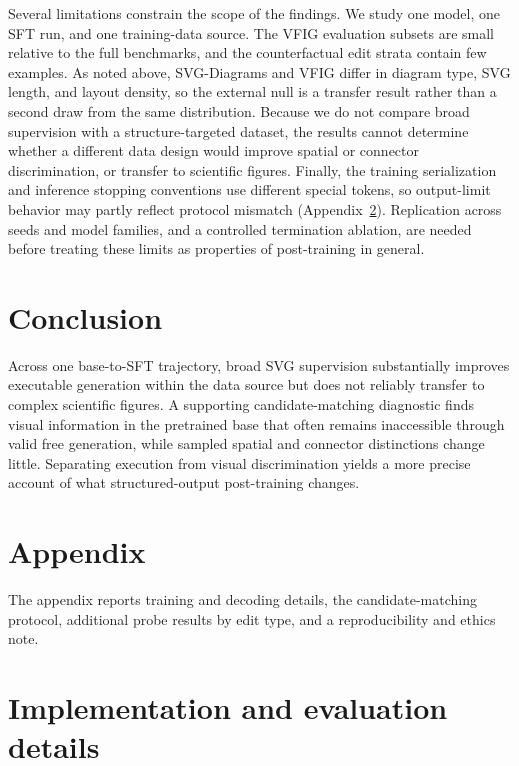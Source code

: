 \documentclass{article}
\begin{document}
Several limitations constrain the scope of the findings. We study one model, one SFT run, and one training-data source. The VFIG evaluation subsets are small relative to the full benchmarks, and the counterfactual edit strata contain few examples. As noted above, SVG-Diagrams and VFIG differ in diagram type, SVG length, and layout density, so the external null is a transfer result rather than a second draw from the same distribution. Because we do not compare broad supervision with a structure-targeted dataset, the results cannot determine whether a different data design would improve spatial or connector discrimination, or transfer to scientific figures. Finally, the training serialization and inference stopping conventions use different special tokens, so output-limit behavior may partly reflect protocol mismatch (Appendix~\ref{app:implementation}). Replication across seeds and model families, and a controlled termination ablation, are needed before treating these limits as properties of post-training in general.

\section{Conclusion}

Across one base-to-SFT trajectory, broad SVG supervision substantially improves executable generation within the data source but does not reliably transfer to complex scientific figures. A supporting candidate-matching diagnostic finds visual information in the pretrained base that often remains inaccessible through valid free generation, while sampled spatial and connector distinctions change little. Separating execution from visual discrimination yields a more precise account of what structured-output post-training changes.




\appendix
\section*{Appendix}
The appendix reports training and decoding details, the candidate-matching protocol, additional probe results by edit type, and a reproducibility and ethics note.

\section{Implementation and evaluation details}
\label{app:implementation}
\end{document}
